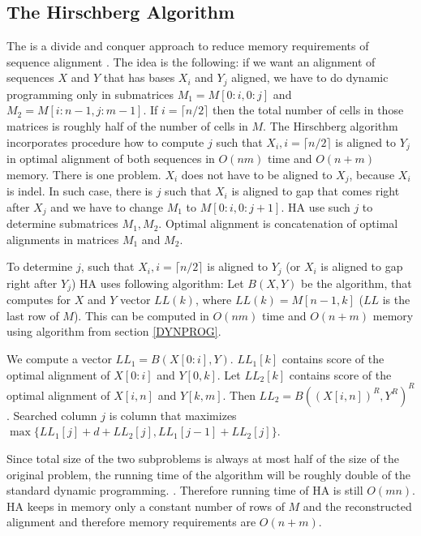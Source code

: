  
\subsection{The Hirschberg Algorithm}

The  is a divide and conquer approach to reduce
memory requirements of sequence alignment \cite{Hirschberg1975}. The idea is
the following: if we want an alignment of sequences $X$ and $Y$ that has bases $X_i$
and $Y_j$ aligned, we have to  do dynamic programming only in submatrices
$M_1=M[0:i,0:j]$ and $M_2=M[i:n-1,j:m-1]$. If $i=\lceil n/2\rceil$ then
the total number of cells in those matrices is roughly half of the number of
cells in $M$. The Hirschberg algorithm incorporates procedure how to compute 
$j$ such that $X_i, i=\lceil n/2\rceil$ is aligned to $Y_j$ in optimal alignment of both sequences in $O(nm)$
time and $O(n+m)$ memory. There is one problem. $X_i$ does not have to
be aligned to $X_j$, because $X_i$ is indel. In such case, there is $j$ such
that $X_i$ is aligned to gap that comes right after $X_j$ and we have to change
$M_1$ to $M[0:i,0:j+1]$. HA use such $j$ to determine submatrices $M_1,M_2$.
Optimal alignment is concatenation of optimal alignments in matrices $M_1$ and
$M_2$.

To determine $j$, such that $X_i,i=\lceil n/2\rceil$ is aligned to $Y_j$ (or
$X_i$ is aligned to gap right after $Y_j$) HA uses following algorithm: Let
$B(X,Y)$ be the algorithm, that computes for $X$ and $Y$ vector $LL(k)$, where
$LL(k)=M[n-1,k]$ ($LL$ is the last row of $M$). This can be computed in
$O(nm)$ time and $O(n+m)$ memory using algorithm from section
\ref{DYNPROG}.  

We compute a vector $LL_1=B(X[0:i],Y)$. $LL_1[k]$ contains score of the optimal
alignment of $X[0:i]$ and $Y[0,k]$. Let $LL_2[k]$ contains score of the optimal
alignment of $X[i,n]$ and $Y[k,m]$. Then $LL_2=B( (X[i,n])^R,Y^R)^R$.
Searched column $j$ is column that maximizes $\max\{LL_1[j]+d+LL_2[j],
LL_1[j-1]+LL_2[j] \}$.

Since total size of the two subproblems is always at most half of the size of the
original problem, the running time of the algorithm will be roughly double of
the standard dynamic programming.
. Therefore
running time of HA is still $O(mn)$. HA keeps in memory only a constant number
of rows of $M$ and the reconstructed alignment and therefore memory requirements are
$O(n+m)$.

